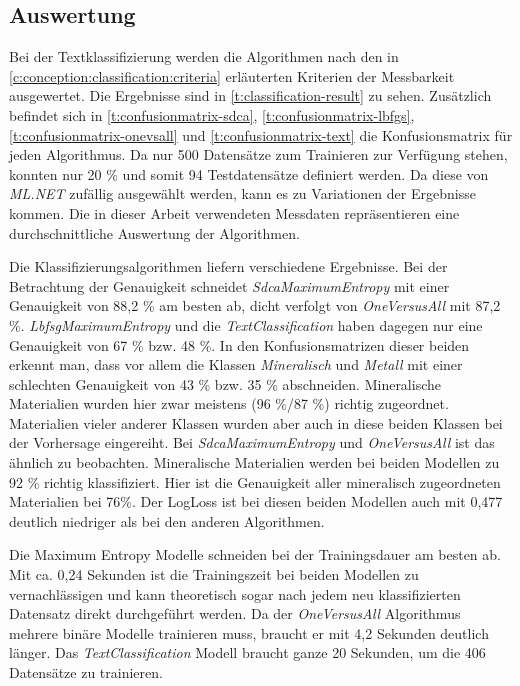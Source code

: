 \subsection{Auswertung}
\label{c:comparison:classification:evaluation}
Bei der Textklassifizierung werden die Algorithmen nach den in \autoref{c:conception:classification:criteria} erläuterten Kriterien der Messbarkeit ausgewertet. Die Ergebnisse sind in \autoref{t:classification-result} zu sehen. Zusätzlich befindet sich in \autoref{t:confusionmatrix-sdca}, \ref{t:confusionmatrix-lbfgs}, \ref{t:confusionmatrix-onevsall} und \ref{t:confusionmatrix-text} die Konfusionsmatrix für jeden Algorithmus. Da nur 500 Datensätze zum Trainieren zur Verfügung stehen, konnten nur 20 \% und somit 94 Testdatensätze definiert werden. Da diese von \textit{ML.NET} zufällig ausgewählt werden, kann es zu Variationen der Ergebnisse kommen. Die in dieser Arbeit verwendeten Messdaten repräsentieren eine durchschnittliche Auswertung der Algorithmen. 



Die Klassifizierungsalgorithmen liefern verschiedene Ergebnisse. Bei der Betrachtung der Genauigkeit schneidet \textit{SdcaMaximumEntropy} mit einer Genauigkeit von 88,2 \% am besten ab, dicht verfolgt von \textit{OneVersusAll} mit 87,2 \%. \textit{LbfsgMaximumEntropy} und die \textit{TextClassification} haben dagegen nur eine Genauigkeit von 67 \% bzw. 48 \%. In den Konfusionsmatrizen dieser beiden erkennt man, dass vor allem die Klassen \textit{Mineralisch} und \textit{Metall} mit einer schlechten Genauigkeit von 43 \% bzw. 35 \% abschneiden. Mineralische Materialien wurden hier zwar meistens (96 \%/87 \%) richtig zugeordnet.  Materialien vieler anderer Klassen wurden aber auch in diese beiden Klassen bei der Vorhersage eingereiht. Bei \textit{SdcaMaximumEntropy} und \textit{OneVersusAll} ist das ähnlich zu beobachten. Mineralische Materialien werden bei beiden Modellen zu 92 \% richtig klassifiziert. Hier ist die Genauigkeit aller mineralisch zugeordneten Materialien bei 76\%. Der LogLoss ist bei diesen beiden Modellen auch mit 0,477 deutlich niedriger als bei den anderen Algorithmen.

Die Maximum Entropy Modelle schneiden bei der Trainingsdauer am besten ab. Mit ca. 0,24 Sekunden ist die Trainingszeit bei beiden Modellen zu vernachlässigen und kann theoretisch sogar nach jedem neu klassifizierten Datensatz direkt durchgeführt werden. Da der \textit{OneVersusAll} Algorithmus mehrere binäre Modelle trainieren muss, braucht er mit 4,2 Sekunden deutlich länger. Das \textit{TextClassification} Modell braucht ganze 20 Sekunden, um die 406 Datensätze zu trainieren.

